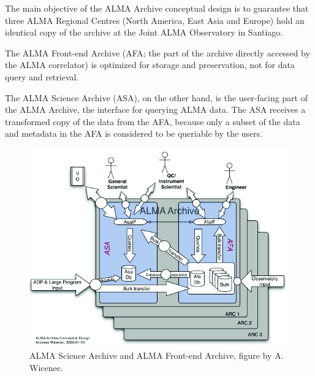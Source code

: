 The main objective of the
ALMA Archive
conceptual design
is to guarantee that three ALMA Regional Centres (North America,
East Asia %
and Europe) hold an identical copy of the archive at the Joint ALMA Observatory in Santiago. 

The ALMA Front-end Archive (AFA; the part of the archive directly accessed by the ALMA correlator)
is optimized for storage and preservation, not for data query and retrieval.

The ALMA Science Archive (ASA), on the other hand, is the user-facing part of the ALMA Archive, the interface for querying ALMA data. The ASA receives a transformed copy of the data from the AFA, because only a subset of the data and metadata in the AFA is considered to be queriable by the users.

\begin{figure}
\centering
\includegraphics[width=\textwidth]{images/alma_science_archive.png}
\caption{ALMA Science Archive and ALMA Front-end Archive, figure by A. Wicenec.}
\end{figure}



